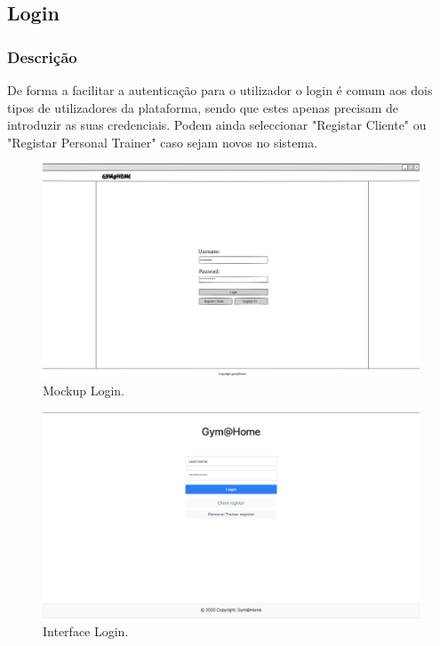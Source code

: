 \subsection{Login}
\label{subsec:login}

\subsubsection{Descrição}
\hspace{5mm} De forma a facilitar a autenticação para o utilizador o login é comum aos dois tipos de utilizadores da plataforma, sendo que estes apenas precisam de introduzir as suas credenciais. Podem ainda seleccionar "Registar Cliente" ou "Registar Personal Trainer" caso sejam novos no sistema.

\begin{figure}[H]
    \centering
    \includegraphics[scale=0.25]{images/mockups/login.png}
    \caption{Mockup Login.}
    \label{fig:mockuplogin}
\end{figure}

\begin{figure}[H]
    \centering
    \includegraphics[scale=0.25]{images/interfaces/login.png}
    \caption{Interface Login.}
    \label{fig:interfacelogin}
\end{figure}

